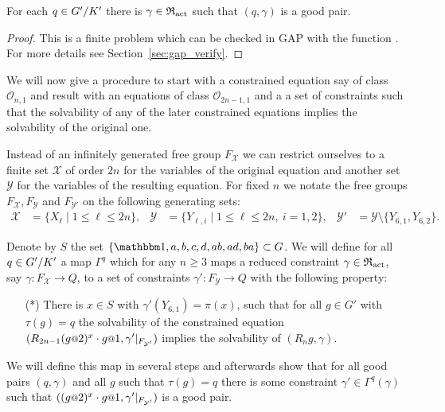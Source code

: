 \documentclass[a4paper,11pt]{amsart}
\begin{document}
\begin{lem} \label{lem:existsGoodGamma}
 For each $q\in{G'/K'}$ there is $\gamma\in \mathfrak{R}_{\operatorname{act}}$ such that $(q,\gamma)$ is a 
 good pair.
\end{lem}
\begin{proof}
 This is a finite problem which can be checked in GAP with the function .
 For more details see Section~\ref{sec:gap_verify}.
\end{proof}
We will now give a procedure to start with a constrained equation say of
class $\mathcal{O}_{n,1}$ and result with an equations of class $\mathcal{O}_
{2n-1,1}$ and a a set of constraints such that the solvability of any of the
later constrained equations implies the solvability of the original one.

Instead of an infinitely generated free group $F_{\mathcal{X}}$ we can restrict
ourselves to a finite set $\mathcal{X}$ of order $2n$ for the variables of the
original equation and another set $\mathcal{Y}$ for the variables of the
resulting equation.
For fixed $n$ we notate the free groups $F_{\mathcal{X}},F_{\mathcal{Y}}$ and $F_
{\mathcal{Y}'}$ on the following generating sets:
\begin{align*}
 \mathcal{X} &= \{ X_\ell \mid 1\leq \ell \leq 2n\},& 
 \mathcal{Y} &= \{ Y_{\ell,i} \mid 1\leq \ell \leq 2n,\ i=1,2 \}, &
 \mathcal{Y}' &=\mathcal{Y}\setminus\{Y_{6,1},Y_{6,2}\}.
\end{align*}

Denote by $S$ the set $\{\id,a,b,c,d,ab,ad,ba\}\subset G$.
 We will define for all $q\in {G'/K'}$ a map $\Gamma^q$ which for any $n
 \ge 3$ maps a reduced constraint $\gamma\in\mathfrak{R}_{\operatorname{act}}$, say $\gamma\colon F_
 {\mathcal X} \to Q$, to a set of constraints $\gamma'\colon F_{\mathcal Y}\to
 Q$ with the following property:
\begin{itemize}
\item[(*)] There is $x\in S$ with $\gamma'(Y_{6,1})=\pi(x)$, such that 
  for all $g\in G'$ with $\tau(g)=q$ the solvability of the constrained equation
  $(R_{2n-1} (g\at{2})^x \cdot g\at{1},\gamma'|_{F_{\mathcal{Y}'}})$ implies
  the solvability of $(R_ng,\gamma)$.
\end{itemize}

We will define this map in several steps and afterwards show that for
all good pairs $(q,\gamma)$ and all $g$ such that $\tau(g)=q$ there is
some constraint $\gamma' \in \Gamma^q(\gamma)$ such that
$((g\at{2})^x \cdot g\at{1},\gamma'|_{F_{\mathcal{Y}'}})$ is a good pair.
 
\end{document}
